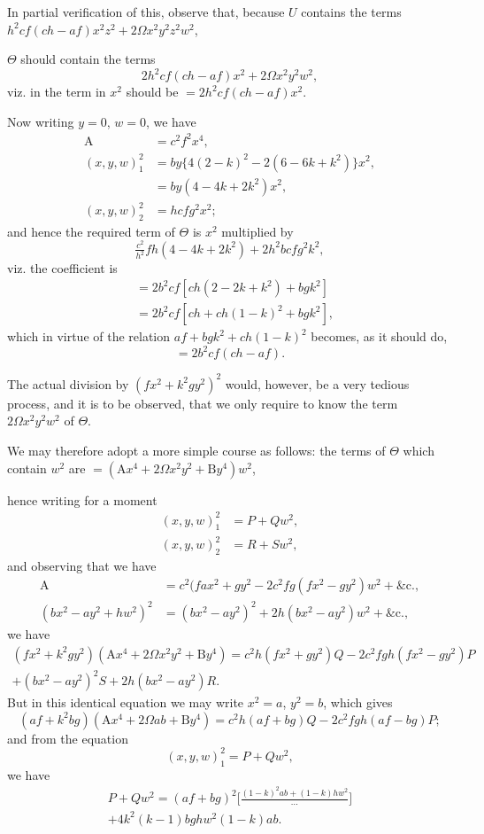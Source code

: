 \documentclass[12pt,a4paper]{article}
\theoremstyle{plain}
\begin{document}
In partial verification of this, observe that, because $U$ contains the terms $h^{2}cf(ch-af)x^{2}z^{2} + 2\Omega x^{2}y^{2}z^{2}w^{2}$,

\newpage
\setcounter{page}{108}

$\Theta$ should contain the terms
\[
2h^{2}cf(ch-af)x^{2} + 2\Omega x^{2}y^{2}w^{2},
\]
viz. in the term in $x^{2}$ should be $= 2h^{2}cf(ch-af)x^{2}$.

Now writing $y=0$, $w=0$, we have
\begin{align*}
\text{A} &= c^{2}f^{2}x^{4}, \\
(x, y, w)_{1}^{2} &= by\{4(2-k)^{2} - 2(6-6k+k^{2})\}x^{2}, \\
&= by(4 - 4k + 2k^{2})x^{2}, \\
(x, y, w)_{2}^{2} &= hcfg^{2}x^{2};
\end{align*}
and hence the required term of $\Theta$ is $x^{2}$ multiplied by
\[
\tfrac{c^{2}}{h^{2}}fh(4 - 4k + 2k^{2}) + 2h^{2}bcfg^{2}k^{2},
\]
viz. the coefficient is
\begin{align*}
&= 2b^{2}cf[ch(2-2k+k^{2}) + bgk^{2}] \\
&= 2b^{2}cf[ch + ch(1-k)^{2} + bgk^{2}],
\end{align*}
which in virtue of the relation $af + bgk^{2} + ch(1-k)^{2}$ becomes, as it should do,
\[
= 2b^{2}cf(ch-af).
\]

The actual division by $(fx^{2} + k^{2}gy^{2})^{2}$ would, however, be a very tedious process, and it is to be observed, that we only require to know the term $2\Omega x^{2}y^{2}w^{2}$ of $\Theta$.

We may therefore adopt a more simple course as follows: the terms of $\Theta$ which contain $w^{2}$ are $= (\text{A}x^{4} + 2\Omega x^{2}y^{2} + \text{B}y^{4})w^{2}$,

hence writing for a moment
\begin{align*}
(x, y, w)_{1}^{2} &= P + Qw^{2}, \\
(x, y, w)_{2}^{2} &= R + Sw^{2},
\end{align*}
and observing that we have
\begin{align*}
\text{A} &= c^{2}(fax^{2} + gy^{2} - 2c^{2}fg(fx^{2} - gy^{2})w^{2} + \&\text{c.}, \\
(bx^{2} - ay^{2} + hw^{2})^{2} &= (bx^{2} - ay^{2})^{2} + 2h(bx^{2} - ay^{2})w^{2} + \&\text{c.},
\end{align*}
we have
%
\begin{multline}
(fx^{2} + k^{2}gy^{2})(\text{A}x^{4} + 2\Omega x^{2}y^{2} + \text{B}y^{4}) = c^{2}h(fx^{2} + gy^{2})Q - 2c^{2}fgh(fx^{2} - gy^{2})P \\
+ (bx^{2} - ay^{2})^{2}S + 2h(bx^{2} - ay^{2})R.
\end{multline}
%
But in this identical equation we may write $x^{2}=a$, $y^{2}=b$, which gives
\[
(af + k^{2}bg)(\text{A}x^{4} + 2\Omega ab + \text{B}y^{4}) = c^{2}h(af + bg)Q - 2c^{2}fgh(af - bg)P;
\]
and from the equation
\[
(x, y, w)_{1}^{2} = P + Qw^{2},
\]
we have
%
\begin{multline}
P + Qw^{2} = (af + bg)^{2}\biggl[\frac{(1-k)^{2}ab + (1-k)hw^{2}}{\cdots}\biggr] \\
+ 4k^{2}(k-1)bghw^{2}(1-k)ab.
\end{multline}
\end{document}
